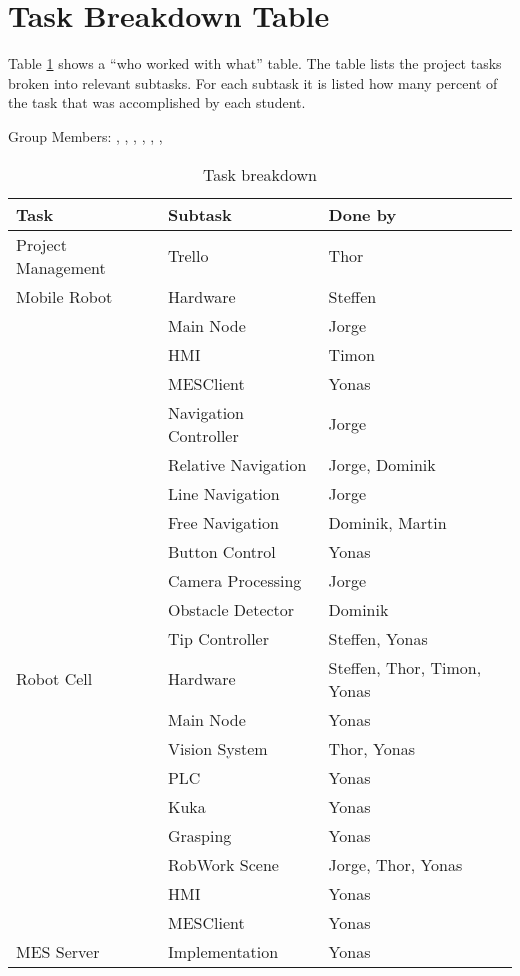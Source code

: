 \section{Task Breakdown Table \label{sec:tasks}}

Table \ref{tab:taks_breakdown} shows a “who worked with what” table. The table lists the project tasks broken into relevant subtasks. For each subtask it is listed how many percent of the task that was accomplished by each student.

\newpage 
Group Members: \authorOne, \authorTwo, \authorThree, \authorFour, \authorFive, \authorSix, \authorSeven

\begin{table}[!h]
\centering
\begin{tabular}{lll}
\textbf{Task} & \textbf{Subtask} & \textbf{Done by} \\ \hline
Project Management     & Trello & Thor        \\ \hline
Mobile Robot & Hardware & Steffen        \\ \hline
 & Main Node & Jorge        \\ \hline
 & HMI & Timon        \\ \hline 
 & MESClient & Yonas        \\ \hline  
 & Navigation Controller & Jorge        \\ \hline 
 & Relative Navigation & Jorge, Dominik        \\ \hline
 & Line Navigation & Jorge        \\ \hline
 & Free Navigation & Dominik, Martin      \\ \hline
 & Button Control & Yonas        \\ \hline
 & Camera Processing & Jorge       \\ \hline
 & Obstacle Detector & Dominik        \\ \hline 
 & Tip Controller & Steffen, Yonas        \\ \hline 
Robot Cell & Hardware & Steffen, Thor, Timon, Yonas \\ \hline
 & Main Node & Yonas        \\ \hline
 & Vision System & Thor, Yonas       \\ \hline
 & PLC & Yonas        \\ \hline
 & Kuka & Yonas      \\ \hline
 & Grasping & Yonas        \\ \hline
 & RobWork Scene & Jorge, Thor, Yonas         \\ \hline
 & HMI & Yonas         \\ \hline
 & MESClient & Yonas        \\ \hline
MES Server & Implementation & Yonas        \\ \hline
\end{tabular}
\caption{Task breakdown}
\label{tab:taks_breakdown}
\end{table}